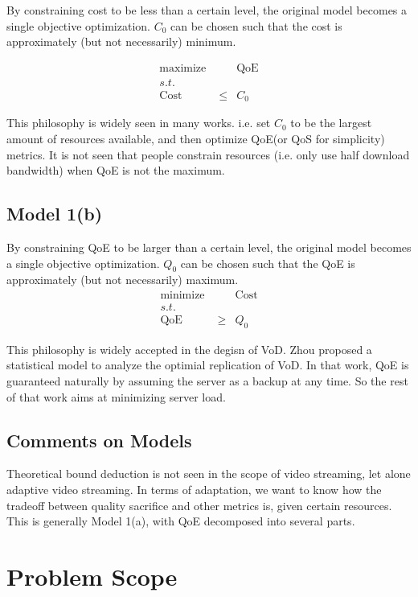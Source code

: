 \documentclass[11pt,a4paper]{article}
\begin{document}
By constraining cost to be less than a certain level, 
the original model becomes a single objective optimization. 
$C_0$ can be chosen such that the cost is approximately 
(but not necessarily)
minimum. 

\begin{eqnarray}
	\text{maximize } && \text{QoE} \\
	s.t. && \nonumber\\
	\text{Cost} &\leq& C_0 \nonumber
\end{eqnarray}

This philosophy is widely seen in many works. i.e. set
$C_0$ to be the largest amount of resources available, 
and then optimize QoE(or QoS for simplicity) metrics. 
It is not seen that people constrain resources
(i.e. only use half download bandwidth) when QoE
is not the maximum. 


\subsection{Model 1(b)}

By constraining QoE to be larger than a certain level, 
the original model becomes a single objective optimization. 
$Q_0$ can be chosen such that the QoE is approximately 
(but not necessarily)
maximum. 
\begin{eqnarray}
	\text{minimize } && \text{Cost} \\
	s.t. && \nonumber\\
	\text{QoE} &\geq & Q_0 \nonumber
\end{eqnarray}

This philosophy is widely accepted in the degisn of VoD. 
Zhou proposed a statistical model\cite{zhou2011statistical}
 to analyze the optimial 
replication of VoD. In that work, QoE is guaranteed naturally
by assuming the server as a backup at any time. So the rest
of that work aims at minimizing server load. 


\subsection{Comments on Models}

Theoretical bound deduction is not seen in the scope 
of video streaming, let alone adaptive video streaming. 
In terms of adaptation, we want to know how the tradeoff
between quality sacrifice and other metrics is, given 
certain resources. This is generally Model 1(a), with 
QoE decomposed into several parts. 


\section{Problem Scope}
\label{sec:problem_scope}
\end{document}
